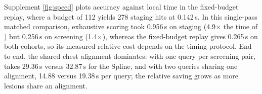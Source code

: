 Supplement \cref{fig:speed} plots accuracy against local time in the fixed-budget replay, where a budget of 112 yields 278 staging hits at 0.142\,s.
In this single-pass matched comparison, exhaustive scoring took 0.956\,s on staging (4.9$\times$ the time of \ours) but 0.256\,s on screening (1.4$\times$), whereas the fixed-budget replay gives 0.265\,s on both cohorts, so its measured relative cost depends on the timing protocol.
End to end, the shared chest alignment dominates: with one query per screening pair, \ours takes 29.36\,s versus 32.87\,s for the Spline, and with two queries sharing one alignment, 14.88 versus 19.38\,s per query; the relative saving grows as more lesions share an alignment.
